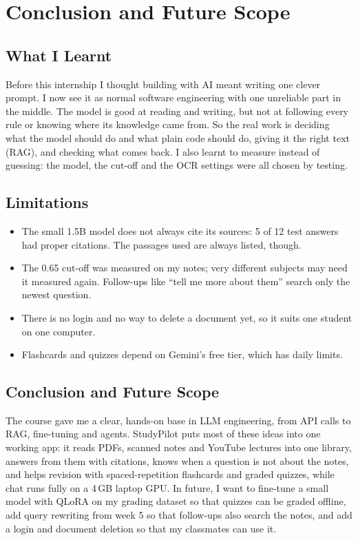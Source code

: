 \documentclass[12pt,a4paper]{report}
\begin{document}
\chapter{Conclusion and Future Scope}

\section{What I Learnt}
Before this internship I thought building with AI meant writing one clever prompt. I now see
it as normal software engineering with one unreliable part in the middle. The model is good
at reading and writing, but not at following every rule or knowing where its knowledge came
from. So the real work is deciding what the model should do and what plain code should do,
giving it the right text (RAG), and checking what comes back. I also learnt to measure
instead of guessing: the model, the cut-off and the OCR settings were all chosen by testing.

\section{Limitations}
\begin{itemize}
  \item The small 1.5B model does not always cite its sources: 5 of 12 test answers had
        proper citations. The passages used are always listed, though.
  \item The 0.65 cut-off was measured on my notes; very different subjects may need it
        measured again. Follow-ups like ``tell me more about them'' search only the newest
        question.
  \item There is no login and no way to delete a document yet, so it suits one student on
        one computer.
  \item Flashcards and quizzes depend on Gemini's free tier, which has daily limits.
\end{itemize}

\section{Conclusion and Future Scope}
The course gave me a clear, hands-on base in LLM engineering, from API calls to RAG,
fine-tuning and agents. StudyPilot puts most of these ideas into one working app: it reads
PDFs, scanned notes and YouTube lectures into one library, answers from them with citations,
knows when a question is not about the notes, and helps revision with spaced-repetition
flashcards and graded quizzes, while chat runs fully on a 4\,GB laptop GPU. In future, I want
to fine-tune a small model with QLoRA on my grading dataset so that quizzes can be graded
offline, add query rewriting from week 5 so that follow-ups also search the notes, and add a
login and document deletion so that my classmates can use it.
\end{document}
